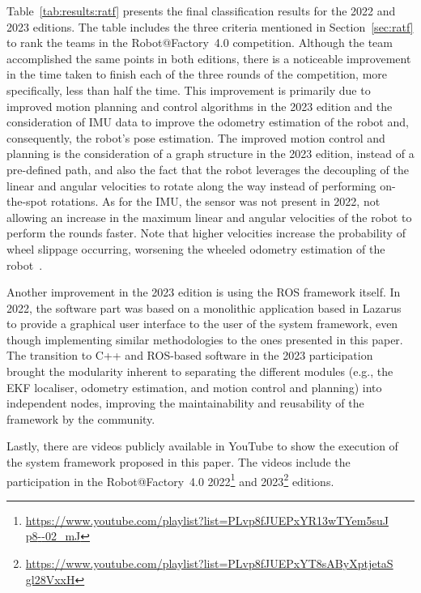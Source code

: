 \documentclass[conference]{IEEEtran}
\begin{document}
Table~\ref{tab:results:ratf} presents the final classification results for the 2022 and 2023 editions.
The table includes the three criteria mentioned in Section~\ref{sec:ratf} to rank the teams in the Robot@Factory~4.0 competition.
Although the team accomplished the same points in both editions, there is a noticeable improvement in the time taken to finish each of the three rounds of the competition, more specifically, less than half the time.
This improvement is primarily due to improved motion planning and control algorithms in the 2023 edition and the consideration of IMU data to improve the odometry estimation of the robot and, consequently, the robot's pose estimation.
The improved motion control and planning is the consideration of a graph structure in the 2023 edition, instead of a pre-defined path, and also the fact that the robot leverages the decoupling of the linear and angular velocities to rotate along the way instead of performing on-the-spot rotations.
As for the IMU, the sensor was not present in 2022, not allowing an increase in the maximum linear and angular velocities of the robot to perform the rounds faster. Note that higher velocities increase the probability of wheel slippage occurring, worsening the wheeled odometry estimation of the robot~\cite{5dpo:sousa-2022}.



Another improvement in the 2023 edition is using the ROS framework itself.
In 2022, the software part was based on a monolithic application based in Lazarus to provide a graphical user interface to the user of the system framework, even though implementing similar methodologies to the ones presented in this paper.
The transition to C++ and ROS-based software in the 2023 participation brought the modularity inherent to separating the different modules (e.g., the EKF localiser, odometry estimation, and motion control and planning) into independent nodes, improving the maintainability and reusability of the framework by the community.

Lastly, there are videos publicly available in YouTube to show the execution of the system framework proposed in this paper. The videos include the participation in the Robot@Factory~4.0 2022\footnote{\href{https://www.youtube.com/playlist?list=PLvp8fJUEPxYR13wTYem5suJp8_--02_mJ}{https://www.youtube.com/playlist?list=PLvp8fJUEPxYR13wTYem5suJ\\p8{-}{-}02\_mJ}} and 2023\footnote{\href{https://www.youtube.com/playlist?list=PLvp8fJUEPxYT8sAByXptjetaSgl28VxxH}{https://www.youtube.com/playlist?list=PLvp8fJUEPxYT8sAByXptjetaS\\gl28VxxH}} editions.
\end{document}
